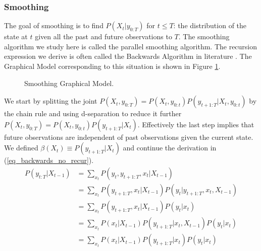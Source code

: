 \subsubsection{Smoothing}
The goal of smoothing is to find $P(X_t|y_{0:T})$ for $t\leq T$: the distribution of the state at $t$ given all the past and future observations to $T$. The smoothing algorithm we study here is called the parallel smoothing algorithm. The recursion expression we derive is often called the Backwards Algorithm in literature \cite{murphy1}. The Graphical Model corresponding to this situation is shown in Figure \ref{fig_linmod_smooth_hmm}.
\begin{figure}[H] 
\centering
{}
\caption{Smoothing Graphical Model.}
\label{fig_linmod_smooth_hmm}
\end{figure}
We start by splitting the joint $P(X_t, y_{0:T}) = P(X_t, y_{0:t})P(y_{t+1:T}|X_t,y_{0:t})$ by the chain rule and using d-separation to reduce it further $P(X_t, y_{0:T}) = P(X_t, y_{0:t})P(y_{t+1:T}|X_t)$. Effectively the last step implies that future observations are independent of past observations given the current state. We defined $\beta(X_t)\equiv P(y_{t+1:T}|X_t)$ and continue the derivation in (\ref{eq_backwards_no_recur}).
\begin{equation}
\begin{aligned}
P(y_{t:T}|X_{t-1}) &= \sum_{x_t} P(y_t, y_{t+1:T}, x_t|X_{t-1}) \\
&= \sum_{x_t} P(y_{t+1:T}, x_t | X_{t-1})P(y_t| y_{t+1:T}, x_t, X_{t-1}) \\
&= \sum_{x_t} P(y_{t+1:T}, x_t | X_{t-1})P(y_t| x_t) \\
&= \sum_{x_t} P(x_t | X_{t-1})P(y_{t+1:T}| x_t,X_{t-1})P(y_t| x_t) \\
&= \sum_{x_t} P(x_t | X_{t-1})P(y_{t+1:T}| x_t)P(y_t| x_t) \\
\end{aligned}
\label{eq_backwards_no_recur}
\end{equation}
